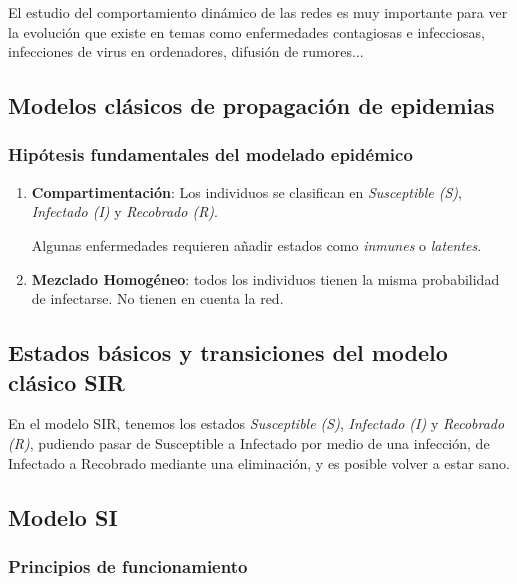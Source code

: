 \documentclass[10pt,spanish, landscape, twocolumn]{article}
\begin{document}
El estudio del comportamiento dinámico de las redes es muy importante para ver la evolución que existe en temas como enfermedades contagiosas e infecciosas, infecciones de virus en ordenadores, difusión de rumores...

\subsection{\textcolor{temasiete}Modelos clásicos de propagación de epidemias}

\subsubsection{\textcolor{temasiete}Hipótesis fundamentales del modelado epidémico}

\begin{enumerate}
    \item \textbf{\textcolor{temasiete}{Compartimentación}}: Los individuos se clasifican en \textcolor{temasiete}{\textit{Susceptible (S)}}, \textcolor{temasiete}{\textit{Infectado (I)}} y \textcolor{temasiete}{\textit{Recobrado (R)}}.

    Algunas enfermedades requieren añadir estados como \textcolor{temasiete}{\textit{inmunes}} o \textcolor{temasiete}{\textit{latentes}}.

    \item \textbf{\textcolor{temasiete}{Mezclado Homogéneo}}: todos los individuos tienen la misma probabilidad de infectarse. No tienen en cuenta la red.
\end{enumerate}

\subsection{\textcolor{temasiete}Estados básicos y transiciones del modelo clásico SIR}

En el modelo SIR, tenemos los estados \textcolor{temasiete}{\textit{Susceptible (S)}}, \textcolor{temasiete}{\textit{Infectado (I)}} y \textcolor{temasiete}{\textit{Recobrado (R)}}, pudiendo pasar de Susceptible a Infectado por medio de una infección, de Infectado a Recobrado mediante una eliminación, y es posible volver a estar sano.

\subsection{\textcolor{temasiete}Modelo SI}
\subsubsection{\textcolor{temasiete}Principios de funcionamiento}
\end{document}
